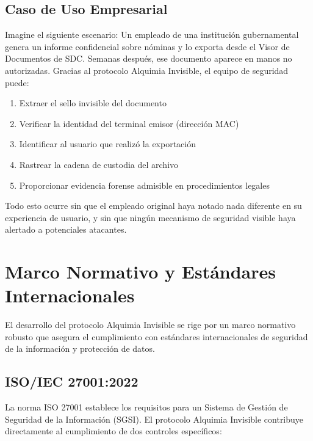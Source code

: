 
\subsection{Caso de Uso Empresarial}

Imagine el siguiente escenario: Un empleado de una institución gubernamental genera un informe confidencial sobre nóminas y lo exporta desde el Visor de Documentos de SDC. Semanas después, ese documento aparece en manos no autorizadas. Gracias al protocolo Alquimia Invisible, el equipo de seguridad puede:

\begin{enumerate}
\item Extraer el sello invisible del documento
\item Verificar la identidad del terminal emisor (dirección MAC)
\item Identificar al usuario que realizó la exportación
\item Rastrear la cadena de custodia del archivo
\item Proporcionar evidencia forense admisible en procedimientos legales
\end{enumerate}

Todo esto ocurre sin que el empleado original haya notado nada diferente en su experiencia de usuario, y sin que ningún mecanismo de seguridad visible haya alertado a potenciales atacantes.

\section{Marco Normativo y Estándares Internacionales}
\label{sec:ai-normas}

El desarrollo del protocolo Alquimia Invisible se rige por un marco normativo robusto que asegura el cumplimiento con estándares internacionales de seguridad de la información y protección de datos.

\subsection{ISO/IEC 27001:2022}

La norma ISO 27001 establece los requisitos para un Sistema de Gestión de Seguridad de la Información (SGSI). El protocolo Alquimia Invisible contribuye directamente al cumplimiento de dos controles específicos:

